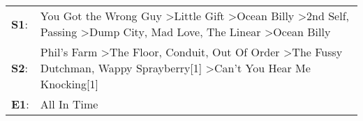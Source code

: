 \begin{supertabular}{p{0.03\textwidth}p{0.92\textwidth}}
 \textbf{S1}:  &  You Got the Wrong Guy\textsuperscript{} \textgreater \enspace Little Gift\textsuperscript{} \textgreater \enspace Ocean Billy\textsuperscript{} \textgreater \enspace 2nd Self\textsuperscript{}, \enspace Passing\textsuperscript{} \textgreater \enspace Dump City\textsuperscript{}, \enspace Mad Love\textsuperscript{}, \enspace The Linear\textsuperscript{} \textgreater \enspace Ocean Billy\textsuperscript{}  \enspace  \\
 \textbf{S2}:  &                                                                           Phil's Farm\textsuperscript{} \textgreater \enspace The Floor\textsuperscript{}, \enspace Conduit\textsuperscript{}, \enspace Out Of Order\textsuperscript{} \textgreater \enspace The Fussy Dutchman\textsuperscript{}, \enspace Wappy Sprayberry[1]\textsuperscript{} \textgreater \enspace Can't You Hear Me Knocking[1]\textsuperscript{}  \enspace  \\
 \textbf{E1}:  &                                                                                                                                                                                                                                                                                                                                                                                           All In Time\textsuperscript{}  \enspace  \\
\end{supertabular}

